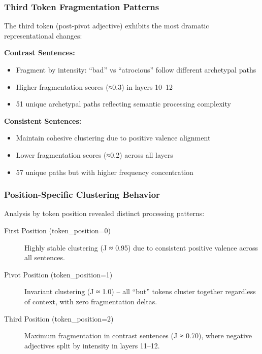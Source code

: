 \subsubsection{Third Token Fragmentation Patterns}

The third token (post-pivot adjective) exhibits the most dramatic representational changes:

\textbf{Contrast Sentences:}
\begin{itemize}
    \item Fragment by intensity: ``bad'' vs ``atrocious'' follow different archetypal paths
    \item Higher fragmentation scores (≈0.3) in layers 10--12
    \item 51 unique archetypal paths reflecting semantic processing complexity
\end{itemize}

\textbf{Consistent Sentences:}
\begin{itemize}
    \item Maintain cohesive clustering due to positive valence alignment
    \item Lower fragmentation scores (≈0.2) across all layers  
    \item 57 unique paths but with higher frequency concentration
\end{itemize}

\subsubsection{Position-Specific Clustering Behavior}

Analysis by token position revealed distinct processing patterns:

\begin{description}
    \item[First Position (token\_position=0)] Highly stable clustering (J ≈ 0.95) due to consistent positive valence across all sentences.
    
    \item[Pivot Position (token\_position=1)] Invariant clustering (J ≈ 1.0) -- all ``but'' tokens cluster together regardless of context, with zero fragmentation deltas.
    
    \item[Third Position (token\_position=2)] Maximum fragmentation in contrast sentences (J ≈ 0.70), where negative adjectives split by intensity in layers 11--12.
\end{description}

